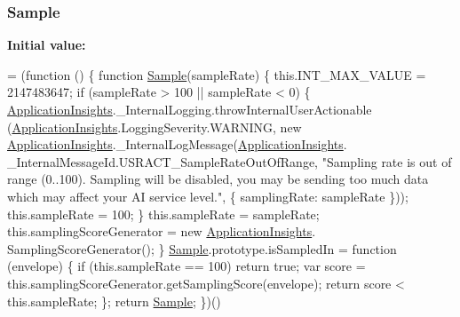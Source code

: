 \subsubsection[{\texorpdfstring{Sample}{Sample}}]{ Sample}\hypertarget{obj_2_release_2_package_2_package_tmp_2_scripts_2ai_80_822_89-build00167_8js_ac4c96e06e96de046ca267f77e98c2cf6}{}\label{obj_2_release_2_package_2_package_tmp_2_scripts_2ai_80_822_89-build00167_8js_ac4c96e06e96de046ca267f77e98c2cf6}
{\bfseries Initial value\+:}
\begin{DoxyCode}
= (\textcolor{keyword}{function} () \{
                \textcolor{keyword}{function} \hyperlink{obj_2_release_2_package_2_package_tmp_2_scripts_2ai_80_822_89-build00167_8js_ac4c96e06e96de046ca267f77e98c2cf6}{Sample}(sampleRate) \{
                    this.INT\_MAX\_VALUE = 2147483647;
                    \textcolor{keywordflow}{if} (sampleRate > 100 || sampleRate < 0) \{
                        \hyperlink{obj_2_release_2_package_2_package_tmp_2_scripts_2ai_80_822_89-build00167_8js_aa415ef4f8cdd699689ef4b61db7656d8}{ApplicationInsights}.\_InternalLogging.throwInternalUserActionable
      (\hyperlink{obj_2_release_2_package_2_package_tmp_2_scripts_2ai_80_822_89-build00167_8js_aa415ef4f8cdd699689ef4b61db7656d8}{ApplicationInsights}.LoggingSeverity.WARNING, \textcolor{keyword}{new} 
      \hyperlink{obj_2_release_2_package_2_package_tmp_2_scripts_2ai_80_822_89-build00167_8js_aa415ef4f8cdd699689ef4b61db7656d8}{ApplicationInsights}.\_InternalLogMessage(\hyperlink{obj_2_release_2_package_2_package_tmp_2_scripts_2ai_80_822_89-build00167_8js_aa415ef4f8cdd699689ef4b61db7656d8}{ApplicationInsights}.
      \_InternalMessageId.USRACT\_SampleRateOutOfRange, \textcolor{stringliteral}{"Sampling rate is out of range (0..100). Sampling will be disabled,
       you may be sending too much data which may affect your AI service level."}, \{ samplingRate: sampleRate \}));
                        this.sampleRate = 100;
                    \}
                    this.sampleRate = sampleRate;
                    this.samplingScoreGenerator = \textcolor{keyword}{new} \hyperlink{obj_2_release_2_package_2_package_tmp_2_scripts_2ai_80_822_89-build00167_8js_aa415ef4f8cdd699689ef4b61db7656d8}{ApplicationInsights}.
      SamplingScoreGenerator();
                \}
                \hyperlink{obj_2_release_2_package_2_package_tmp_2_scripts_2ai_80_822_89-build00167_8js_ac4c96e06e96de046ca267f77e98c2cf6}{Sample}.prototype.isSampledIn = \textcolor{keyword}{function} (envelope) \{
                    \textcolor{keywordflow}{if} (this.sampleRate == 100)
                        \textcolor{keywordflow}{return} \textcolor{keyword}{true};
                    var score = this.samplingScoreGenerator.getSamplingScore(envelope);
                    \textcolor{keywordflow}{return} score < this.sampleRate;
                \};
                \textcolor{keywordflow}{return} \hyperlink{obj_2_release_2_package_2_package_tmp_2_scripts_2ai_80_822_89-build00167_8js_ac4c96e06e96de046ca267f77e98c2cf6}{Sample};
            \})()
\end{DoxyCode}


